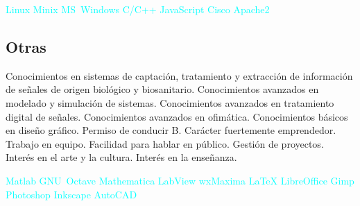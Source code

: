 \documentclass[11pt,a4paper,sans,spanish]{moderncv}
\begin{document}
\begin{center}
\textcolor{cyan}{
Linux \quad{} Minix \quad{} MS~Windows \quad{} C/C++ \quad{} JavaScript \quad{} Cisco \quad{} Apache2 
}
\end{center}

\subsection{Otras}
Conocimientos en sistemas de captación, tratamiento y extracción de información de señales de origen biológico y biosanitario.\quad
Conocimientos avanzados en modelado y simulación de sistemas.\quad
Conocimientos avanzados en tratamiento digital de señales.\quad
Conocimientos avanzados en ofimática.\quad
Conocimientos básicos en diseño gráfico.\quad
Permiso de conducir B. \quad{} Carácter fuertemente emprendedor. \quad{} Trabajo en equipo. \quad{} Facilidad para hablar en público. \quad{} Gestión de proyectos. \quad{} Interés en el arte y la cultura. \quad{} Interés en la enseñanza.

\begin{center}
\textcolor{cyan}{
Matlab \quad{} GNU~Octave \quad{} Mathematica \quad{} LabView \quad{} wxMaxima \quad{} LaTeX \quad{} LibreOffice \quad{} Gimp \quad{} Photoshop \quad{} Inkscape \quad{} AutoCAD
}
\end{center}
\end{document}
